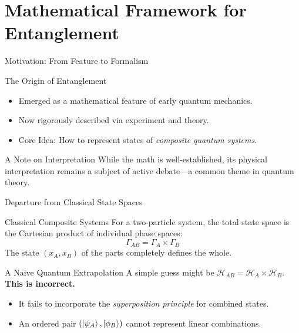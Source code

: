 \section{Mathematical Framework for Entanglement}

\begin{frame}{Motivation: From Feature to Formalism}
  \begin{block}{The Origin of Entanglement}
    \begin{itemize}
      \item Emerged as a mathematical feature of early quantum mechanics.
      \pause
      \item Now rigorously described via experiment and theory.
      \pause
      \item Core Idea: How to represent states of \emph{composite quantum
        systems}.
    \end{itemize}
  \end{block}
  \pause

  \begin{alertblock}{A Note on Interpretation}
    While the math is well-established, its physical interpretation remains a
    subject of active debate---a common theme in quantum theory.
  \end{alertblock}
\end{frame}

\begin{frame}{Departure from Classical State Spaces}
  \begin{block}{Classical Composite Systems}
    For a two-particle system, the total state space is the
    \alert{Cartesian product} of individual phase spaces:
    \[
      \Gamma_{AB} = \Gamma_A \times \Gamma_B
    \]
    The state $(x_A, x_B)$ of the parts completely defines the whole.
  \end{block}
  \pause
  \begin{alertblock}{A Naive Quantum Extrapolation}
    A simple guess might be $\mathcal{H}_{AB} = \mathcal{H}_A \times
    \mathcal{H}_B$. \pause \textbf{This is incorrect.}
    \begin{itemize}
      \item It fails to incorporate the \emph{superposition principle} for
        combined states.
      \item An ordered pair $(\ket{\psi_A}, \ket{\phi_B})$ cannot represent
        linear combinations.
    \end{itemize}
  \end{alertblock}
\end{frame}

